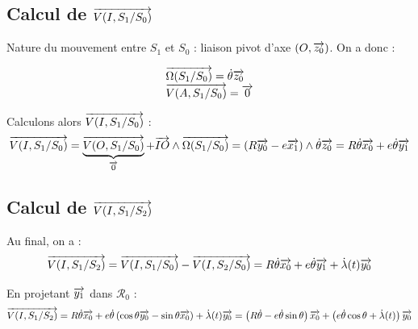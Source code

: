 \documentclass[10pt,oneside]{article}
\begin{document}
\subsection*{Calcul de $\overrightarrow{V(I,S_1/S_0)}$}
Nature du mouvement entre $S_1$ et $S_0$ : liaison pivot d'axe $(O,\overrightarrow{z_0})$.
On a donc : 

$$
\begin{array}{l}
\overrightarrow{\Omega(S_1/S_0)} = \dot{\theta}\overrightarrow{z_0} \\
\overrightarrow{V(A,S_1/S_0)} = \overrightarrow{0} \\
\end{array}
$$

Calculons alors $\overrightarrow{V(I,S_1/S_0)}$ :
$$
\overrightarrow{V(I,S_1/S_0)} 
= \underbrace{\overrightarrow{V(O,S_1/S_0)}}_{\overrightarrow{0} }
+ \overrightarrow{IO} \wedge \overrightarrow{\Omega(S_1/S_0)} = \left(R\overrightarrow{y_0}-e\overrightarrow{x_1}\right) \wedge \dot{\theta}\overrightarrow{z_0}
= R\dot{\theta}\overrightarrow{x_0} + e\dot{\theta}\overrightarrow{y_1}
$$

%

\subsection*{Calcul de $\overrightarrow{V(I,S_1/S_2)}$}

Au final, on a :
$$
\overrightarrow{V(I,S_1/S_2)} = \overrightarrow{V(I,S_1/S_0)} - \overrightarrow{V(I,S_2/S_0)}
= R\dot{\theta}\overrightarrow{x_0} + e\dot{\theta}\overrightarrow{y_1} +\dot{\lambda}(t) \overrightarrow{y_0}
$$

En projetant $\overrightarrow{y_1}$ dans $\mathcal{R}_0$ : 
$$
\overrightarrow{V(I,S_1/S_2)} 
= R\dot{\theta}\overrightarrow{x_0} + e\dot{\theta}\left( \cos\theta \overrightarrow{y_0} - \sin\theta \overrightarrow{x_0} \right)+\dot{\lambda}(t) \overrightarrow{y_0} 
= \left(R\dot{\theta} - e\dot{\theta}\sin\theta \right) \overrightarrow{x_0} + \left(e\dot{\theta} \cos\theta +\dot{\lambda}(t) \right) \overrightarrow{y_0}
$$
\end{document}
